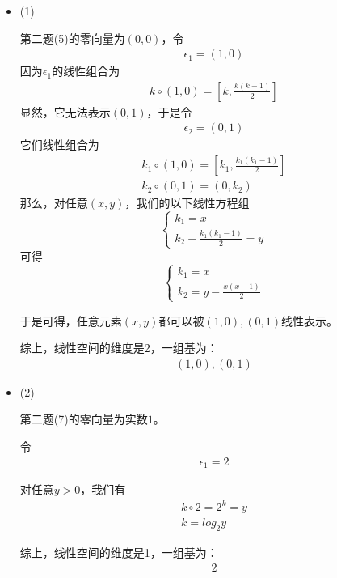 \documentclass{article}
\begin{document}
\begin{itemize}
  \item (1)

        第二题(5)的零向量为$(0, 0)$，令
        \begin{align*}
          \epsilon_1 = (1, 0)
        \end{align*}
        因为$\epsilon_1$的线性组合为
        \begin{align*}
          k \circ (1, 0) = [k, \frac{k(k-1)}{2}]
        \end{align*}
        显然，它无法表示$(0, 1)$，于是令
        \begin{align*}
          \epsilon_2 = (0, 1)
        \end{align*}
        它们线性组合为
        \begin{align*}
          k_1 \circ (1, 0) = [k_1, \frac{k_1(k_1-1)}{2}] \\
          k_2 \circ (0, 1) = (0, k_2)
        \end{align*}
        那么，对任意$(x, y)$，我们的以下线性方程组
        \begin{equation*}
          \begin{cases*}
            k_1 = x \\
            k_2 + \frac{k_1(k_1-1)}{2} = y
          \end{cases*}
        \end{equation*}
        可得
        \begin{equation*}
          \begin{cases*}
            k_1 = x \\
            k_2 = y - \frac{x(x-1)}{2}
          \end{cases*}
        \end{equation*}

        于是可得，任意元素$(x, y)$都可以被$(1, 0), (0, 1)$线性表示。

        综上，线性空间的维度是2，一组基为：
        \begin{align*}
          (1, 0), (0, 1)
        \end{align*}

  \item (2)

        第二题(7)的零向量为实数$1$。

        令
        \begin{align*}
          \epsilon_1 = 2
        \end{align*}

        对任意$y > 0$，我们有
        \begin{align*}
          k \circ 2 = 2^{k} = y \\
          k = log_2 y
        \end{align*}

        综上，线性空间的维度是1，一组基为：
        \begin{align*}
          2
        \end{align*}
\end{itemize}
\end{document}
